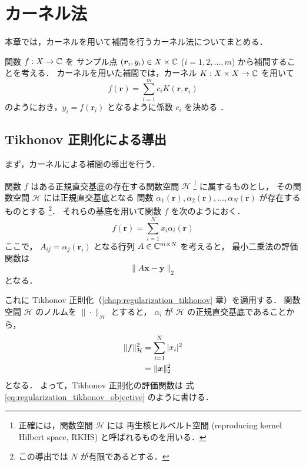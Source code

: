 %

\chapter{カーネル法}

本章では，カーネルを用いて補間を行うカーネル法についてまとめる．

関数 $f : X \to \mathbb{C}$ を
サンプル点 $(\bm{r}_i, y_i) \in X \times \mathbb{C}$ ($i = 1, 2, \ldots, m$) から補間することを考える．
カーネルを用いた補間では，カーネル $K : X \times X \to \mathbb{C}$ を用いて
\begin{equation}
    f(\bm{r}) = \sum_{i=1}^m c_i K(\bm{r}, \bm{r}_i)
\end{equation}
のようにおき，$y_i = f(\bm{r}_i)$ となるように係数 $c_i$ を決める
\cite{Fukumizu2010}．

\section{Tikhonov 正則化による導出}\label{sec:interp_kernel_tikhonov}

まず，カーネルによる補間の導出を行う．

関数 $f$ はある正規直交基底の存在する関数空間 $\mathcal{H}$
\footnote{正確には，関数空間 $\mathcal{H}$ には%
    再生核ヒルベルト空間 (reproducing kernel Hilbert space, RKHS)%
    と呼ばれるものを用いる．}
に属するものとし，
その関数空間 $\mathcal{H}$ には正規直交基底となる
関数 $\alpha_1(\bm{r}), \alpha_2(\bm{r}), \ldots, \alpha_N(\bm{r})$ が存在するものとする
\footnote{この導出では $N$ が有限であるとする．}．
それらの基底を用いて関数 $f$ を次のようにおく．
\begin{equation}
    f(\bm{r}) = \sum_{i = 1}^{N} x_i \alpha_i(\bm{r})
\end{equation}
ここで，
$A_{ij} = \alpha_j(\bm{r}_i)$ となる行列 $A \in \mathbb{C}^{m \times N}$ を考えると，
最小二乗法の評価関数は
\begin{equation}
    \|A \bm{x} - \bm{y}\|_2
\end{equation}
となる．

これに Tikhonov 正則化（\ref{chap:regularization_tikhonov} 章）を適用する．
関数空間 $\mathcal{H}$ のノルムを $\|\cdot\|_{\mathcal{H}}$ とすると，
$\alpha_i$ が $\mathcal{H}$ の正規直交基底であることから，
\begin{align}
    \|f\|_{\mathcal{H}}^2
     & = \sum_{i = 1}^{N} |x_i|^2 \notag \\
     & = \|\bm{x}\|_2^2
\end{align}
となる．
よって，Tikhonov 正則化の評価関数は
式 \eqref{eq:regularization_tikhonov_objective} のように書ける．

